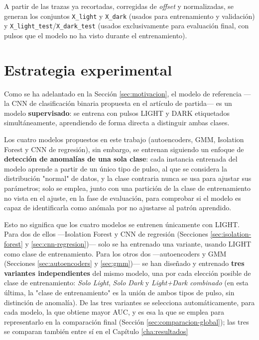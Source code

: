 A partir de las trazas ya recortadas, corregidas de \textit{offset} y normalizadas, se generan los conjuntos \texttt{X\_light} y \texttt{X\_dark} (usados para entrenamiento y validación) y \texttt{X\_light\_test}/\texttt{X\_dark\_test} (usados exclusivamente para evaluación final, con pulsos que el modelo no ha visto durante el entrenamiento).


\section{Estrategia experimental}
\label{sec:estrategia-experimental}

Como se ha adelantado en la Sección \ref{sec:motivacion}, el modelo de referencia —la CNN de clasificación binaria propuesta en el artículo de partida— es un modelo \textbf{supervisado}: se entrena con pulsos LIGHT y DARK etiquetados simultáneamente, aprendiendo de forma directa a distinguir ambas clases.

Los cuatro modelos propuestos en este trabajo (autoencoders, GMM, Isolation Forest y CNN de regresión), sin embargo, se entrenan siguiendo un enfoque de \textbf{detección de anomalías de una sola clase}: cada instancia entrenada del modelo aprende a partir de un único tipo de pulso, al que se considera la distribución "normal" de datos, y la clase contraria nunca se usa para ajustar sus parámetros; solo se emplea, junto con una partición de la clase de entrenamiento no vista en el ajuste, en la fase de evaluación, para comprobar si el modelo es capaz de identificarla como anómala por no ajustarse al patrón aprendido.

Esto no significa que los cuatro modelos se entrenen únicamente con LIGHT. Para dos de ellos —Isolation Forest y CNN de regresión (Secciones \ref{sec:isolation-forest} y \ref{sec:cnn-regresion})— solo se ha entrenado una variante, usando LIGHT como clase de entrenamiento. Para los otros dos —autoencoders y GMM (Secciones \ref{sec:autoencoders} y \ref{sec:gmm})— se han diseñado y entrenado \textbf{tres variantes independientes} del mismo modelo, una por cada elección posible de clase de entrenamiento: \emph{Solo Light}, \emph{Solo Dark} y \emph{Light+Dark combinado} (en esta última, la "clase de entrenamiento" es la unión de ambos tipos de pulso, sin distinción de anomalía). De las tres variantes se selecciona automáticamente, para cada modelo, la que obtiene mayor AUC, y es esa la que se emplea para representarlo en la comparación final (Sección \ref{sec:comparacion-global}); las tres se comparan también entre sí en el Capítulo \ref{cha:resultados}

